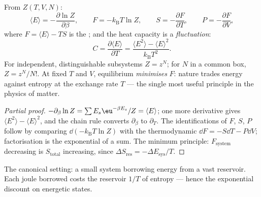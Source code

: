 \begin{proposition}\label{prop:b3:canonical-ensemble:machine}
From $Z(T, V, N)$:
\[
\langle E\rangle = -\frac{\partial\ln Z}{\partial\beta} , \qquad
F = -k_{\text{B}}T\ln Z , \qquad
S = -\frac{\partial F}{\partial T} , \qquad
P = -\frac{\partial F}{\partial V} ,
\]
where $F = \langle E\rangle - TS$ is the \emph{}; and
the heat capacity is a \emph{fluctuation}:
\[
C = \frac{\partial\langle E\rangle}{\partial T}
 = \frac{\langle E^2\rangle - \langle E\rangle^2}
{k_{\text{B}}T^2} .
\]
For independent, distinguishable subsystems $Z = z^N$; for $N$
 in a common box, $Z = z^N/N!$. At fixed $T$ and
$V$, equilibrium \emph{minimises} $F$: nature trades energy against
entropy at the exchange rate $T$ --- the single most useful
principle in the physics of matter.
\end{proposition}

\begin{proof}[Partial proof]
$-\partial_\beta\ln Z = \sum E_s\eu^{-\beta E_s}/Z = \langle
E\rangle$; one more derivative gives $\langle E^2\rangle - \langle
E\rangle^2$, and the chain rule converts $\partial_\beta$ to
$\partial_T$. The identifications of $F$, $S$, $P$ follow by
comparing $\dd(-k_{\text{B}}T\ln Z)$ with the thermodynamic
$\dd F = -S\dd T - P\dd V$; factorisation is the exponential of a
sum. The minimum principle: $F_{\text{system}}$ decreasing is
$S_{\text{total}}$ increasing, since $\Delta S_{\text{res}} =
-\Delta E_{\text{sys}}/T$.
\end{proof}

\begin{omfigure}

{\small The canonical setting: a small system borrowing energy from
a vast reservoir. Each joule borrowed costs the reservoir $1/T$ of
entropy --- hence the exponential discount on energetic states.}
\end{omfigure}

